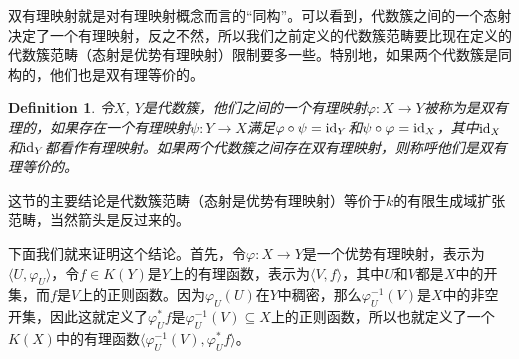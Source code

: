 \documentclass[9pt]{extbook}
\theoremstyle{plain}%
\newtheorem{defi}{Definition}[section]%
\begin{document}
双有理映射就是对有理映射概念而言的“同构”。可以看到，代数簇之间的一个态射决定了一个有理映射，反之不然，所以我们之前定义的代数簇范畴要比现在定义的代数簇范畴（态射是优势有理映射）限制要多一些。特别地，如果两个代数簇是同构的，他们也是双有理等价的。
\begin{defi}
令$X$, $Y$是代数簇，他们之间的一个有理映射$\varphi : X\to Y$被称为是双有理的，如果存在一个有理映射$\psi:Y\to X$满足$\varphi\circ \psi=\operatorname{id}_Y$和$\psi\circ \varphi=\operatorname{id}_X$，其中$\operatorname{id}_X$和$\operatorname{id}_Y$都看作有理映射。如果两个代数簇之间存在双有理映射，则称呼他们是双有理等价的。
\end{defi}

这节的主要结论是代数簇范畴（态射是优势有理映射）等价于$k$的有限生成域扩张范畴，当然箭头是反过来的。

下面我们就来证明这个结论。首先，令$\varphi:X\to Y$是一个优势有理映射，表示为$\langle U,\varphi_U\rangle$，令$f\in K(Y)$是$Y$上的有理函数，表示为$\langle V,f\rangle$，其中$U$和$V$都是$X$中的开集，而$f$是$V$上的正则函数。因为$\varphi_U(U)$在$Y$中稠密，那么$\varphi_U^{-1}(V)$是$X$中的非空开集，因此这就定义了$\varphi_U^*f$是$\varphi_U^{-1}(V)\subseteq X$上的正则函数，所以也就定义了一个$K(X)$中的有理函数$\langle \varphi_U^{-1}(V),\varphi_U^*f\rangle$。
\end{document}
